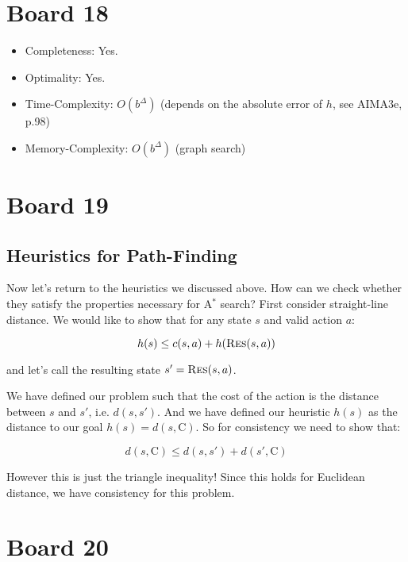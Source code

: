 \documentclass[10pt]{article}
\begin{document}
\section{Board 18}
\begin{itemize}
\item Completeness: Yes.  
\item Optimality: Yes. 
\item Time-Complexity: $O(b^\Delta)$ (depends on the absolute error of $h$, see AIMA3e, p.98)
\item Memory-Complexity: $O(b^\Delta)$ (graph search)
\end{itemize}


\section{Board 19}
\subsection{Heuristics for Path-Finding}

Now let's return to the heuristics we discussed above. How can we check whether they satisfy the properties necessary for A$^*$ search? First consider straight-line distance. We would like to show that for any state $s$ and valid action $a$:

\[h(s) \leq c(s, a) + h(\mathrm{\textsc{Res}}(s, a))\]

\noindent and let's call the resulting state $s' = \mathrm{\textsc{Res}}(s, a)$.

We have defined our problem such that the cost of the action is the distance between $s$ and $s'$, i.e. $d(s, s')$. And we have defined our heuristic $h(s)$ as the distance to our goal $h(s) = d(s, \mathrm{C})$. So for consistency we need to show that: 



\[d(s, \mathrm{C}) \leq d(s, s') + d(s', \mathrm{C})\]

\noindent However this is just the triangle inequality! Since this holds for Euclidean distance, we have consistency for this problem.





\section{Board 20}
\end{document}
